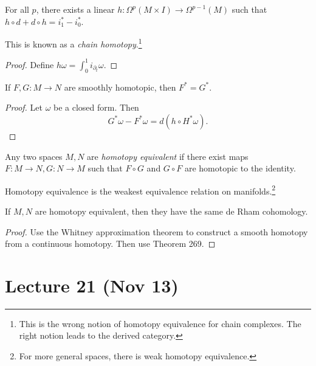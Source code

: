 \documentclass[twoside, 10pt]{article}
\begin{document}
    \begin{lem}
        For all $p$, there exists a linear $h: \Omega^p(M \times I) \to \Omega^{p-1}(M)$ such that $h \circ d + d \circ h = i_1^* - i_0^*$.
    \end{lem}

    \begin{rmk}
        This is known as a \textit{chain homotopy}.\footnote{This is the wrong notion of homotopy equivalence for chain complexes. The right notion leads to the derived category.}
    \end{rmk}

    \begin{proof}
        Define $h \omega = \int_0^1 i_{\partial_t} \omega$.
    \end{proof}

    \begin{thm}
        If $F,G:M \to N$ are smoothly homotopic, then $F^* = G^*$.
    \end{thm}

    \begin{proof}
        Let $\omega$ be a closed form. Then
        \[ G^*\omega - F^*\omega = d(h\circ H^*\omega).\]
    \end{proof}

    \begin{defn}
        Any two spaces $M,N$ are \textit{homotopy equivalent} if there exist maps $F:M \to N, G:N \to M$ such that $F \circ G$ and $G \circ F$ are homotopic to the identity.
    \end{defn}

    \begin{rmk}
        Homotopy equivalence is the weakest equivalence relation on manifolds.\footnote{For more general spaces, there is weak homotopy equivalence.}
    \end{rmk}

    \begin{cor}
        If $M,N$ are homotopy equivalent, then they have the same de Rham cohomology.
    \end{cor}

    \begin{proof}
        Use the Whitney approximation theorem to construct a smooth homotopy from a continuous homotopy. Then use Theorem 269.
    \end{proof}

    \section{Lecture 21 (Nov 13)}%
    \label{sec:lecture_21_nov_13_}
\end{document}
